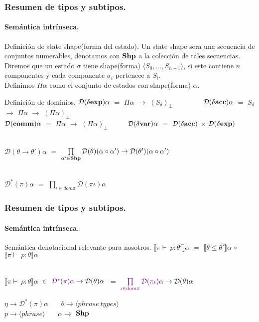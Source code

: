 \documentclass{beamer} %
\newcommand{\semBrcks}[1]{\llbracket #1 \rrbracket}
\newcommand{\angles}[1]{\langle #1 \rangle}
\newcommand{\D}{\mathcal{D}}
\newcommand{\deltaexp}{\delta \bf{exp}}
\newcommand{\deltavar}{\delta \bf{var}}
\newcommand{\deltaacc}{\delta \bf{acc}}
\newcommand{\comm}{\bf{comm}}
\newcommand{\setstate}{\Pi \alpha}
\begin{document}
\begin{frame}
\frametitle{Resumen de tipos y subtipos.}
\framesubtitle{Sem\'antica intr\'inseca.}
\begin{block}{Definici\'on de state shape(forma del estado).}\small
Un state shape sera una secuencia de conjuntos numerables, denotamos con $\bf{Shp}$ a la colecci\'on de tales secuencias.\\
Diremos que un estado $\sigma$ tiene shape(forma) $\angles{S_0, \ldots, S_{n-1}}$, si este contiene $n$ componentes
y cada componente $\sigma_i$ pertenece a $S_i$.\\
Definimos $\setstate$ como el conjunto de estados con shape(forma) $\alpha$.
\end{block}
\begin{block}{Definici\'on de dominios.}\small
$\D(\deltaexp)\alpha$ $=$ $\setstate$ $\rightarrow$ $(S_\delta)_\bot$ \ \ \ \ \ \ \ \ 
$\D(\deltaacc)\alpha$ $=$ $S_\delta$ $\rightarrow$ $\setstate$ $\rightarrow$ $(\setstate)_\bot$\\
$\D(\comm)\alpha$ $=$ $\setstate$ $\rightarrow$ $(\setstate)_\bot$ \ \ \ \ \ 
$\D(\deltavar)\alpha$ $=$ $\D(\deltaacc)$ $\times$ $\D(\deltaexp)$ \\
\

$\D(\theta \rightarrow \theta')\alpha$ $=$ 
$\prod\limits_{\alpha' \in \bf{Shp}} \D(\theta)(\alpha \circ \alpha') \rightarrow \D(\theta')(\alpha \circ \alpha')$ \\
\

$\D^* (\pi)\alpha$ $=$ $\prod\limits_{\iota \in dom \pi} \D(\pi\iota)\alpha$
\end{block}
\end{frame}

\begin{frame}
\frametitle{Resumen de tipos y subtipos.}
\framesubtitle{Sem\'antica intr\'inseca.}
\begin{block}{Sem\'antica denotacional relevante para nosotros.}\small
$\semBrcks{\pi \vdash \ p:\theta'} \alpha$ $=$ $\semBrcks{\theta \leq \theta'}\alpha$ $\circ$ $\semBrcks{\pi \vdash \ p:\theta} \alpha$\\
\

$\semBrcks{\pi \vdash \ p:\theta} \alpha$ $\in$ $\textcolor{violet}{\D^{*}(\pi)\alpha} \rightarrow \D(\theta)\alpha$ $\ =$ 
$\textcolor{violet}{\prod\limits_{\iota \in dom \pi} \D(\pi\iota)\alpha} \rightarrow \D(\theta)\alpha$\\

\begin{center}
$\eta \rightarrow \D^{*}(\pi)\alpha$ \ \ \
$\theta \rightarrow \angles{phrase \ types}$\\

$p \rightarrow \angles{phrase}$ \ \ \
$\alpha \rightarrow$ ${\bf Shp}$\\
\end{center}
\end{block}
\end{frame}
\end{document}
